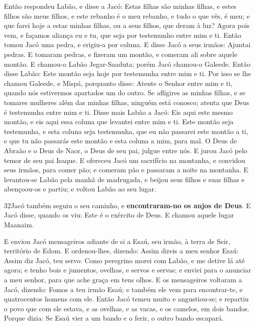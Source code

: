 Então respondeu Labão, e disse a Jacó: Estas filhas são minhas
filhas, e estes filhos são meus filhos, e este rebanho é o meu
rebanho, e tudo o que vês, é meu; e que farei hoje a estas minhas
filhas, ou a seus filhos, que deram à luz? Agora pois vem, e
façamos aliança eu e tu, que seja por testemunho entre mim e ti.
Então tomou Jacó uma pedra, e erigiu-a por coluna. E
disse Jacó a seus irmãos: Ajuntai pedras. E tomaram pedras, e
fizeram um montão, e comeram ali sobre aquele montão. E
chamou-o Labão Jegar-Saaduta; porém Jacó chamou-o Galeede.
Então disse Labão: Este montão seja hoje por testemunha entre
mim e ti. Por isso se lhe chamou Galeede, e Mispá, porquanto
disse: Atente o Senhor entre mim e ti, quando nós estivermos
apartados um do outro. Se afligires as minhas filhas, e se
tomares mulheres além das minhas filhas, ninguém está conosco;
atenta que Deus é testemunha entre mim e ti. Disse mais Labão
a Jacó: Eis aqui este mesmo montão, e eis aqui essa coluna que
levantei entre mim e ti. Este montão seja testemunha, e esta
coluna seja testemunha, que eu não passarei este montão a ti, e que
tu não passarás este montão e esta coluna a mim, para mal. O
Deus de Abraão e o Deus de Naor, o Deus de seu pai, julgue entre
nós. E jurou Jacó pelo temor de seu pai Isaque. E ofereceu
Jacó um sacrifício na montanha, e convidou seus irmãos, para comer
pão; e comeram pão e passaram a noite na montanha. E
levantou-se Labão pela manhã de madrugada, e beijou seus filhos e
suas filhas e abençoou-os e partiu; e voltou Labão ao seu lugar.

\smallskip

\lettrine{32} Jacó também seguiu o seu caminho, e
\textbf{encontraram-no os anjos de Deus}. E Jacó disse, quando
os viu: Este é o exército de Deus. E chamou aquele lugar Maanaim.

E enviou Jacó mensageiros adiante de si a Esaú, seu irmão, à terra
de Seir, território de Edom. E ordenou-lhes, dizendo: Assim
direis a meu senhor Esaú: Assim diz Jacó, teu servo: Como peregrino
morei com Labão, e me detive lá até agora; e tenho bois e
jumentos, ovelhas, e servos e servas; e enviei para o anunciar a meu
senhor, para que ache graça em teus olhos. E os mensageiros
voltaram a Jacó, dizendo: Fomos a teu irmão Esaú; e também ele vem
para encontrar-te, e quatrocentos homens com ele. Então Jacó
temeu muito e angustiou-se; e repartiu o povo que com ele estava, e
as ovelhas, e as vacas, e os camelos, em dois bandos. Porque
dizia: Se Esaú vier a um bando e o ferir, o outro bando escapará.

